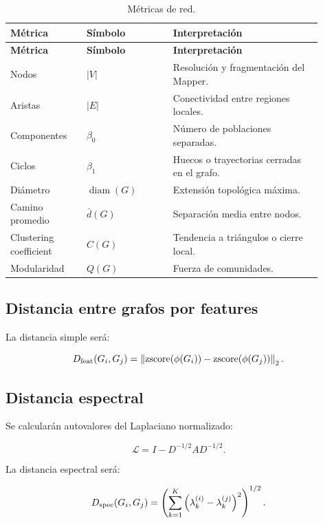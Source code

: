 \documentclass[11pt,letterpaper]{article}
\begin{document}
\begin{longtable}{p{0.22\linewidth}p{0.25\linewidth}p{0.43\linewidth}}
\caption{Métricas de red.}\\
\toprule
\textbf{Métrica} & \textbf{Símbolo} & \textbf{Interpretación} \\
\midrule
\endfirsthead
\toprule
\textbf{Métrica} & \textbf{Símbolo} & \textbf{Interpretación} \\
\midrule
\endhead
Nodos & $|V|$ & Resolución y fragmentación del Mapper. \\
Aristas & $|E|$ & Conectividad entre regiones locales. \\
Componentes & $\beta_0$ & Número de poblaciones separadas. \\
Ciclos & $\beta_1$ & Huecos o trayectorias cerradas en el grafo. \\
Diámetro & $\operatorname{diam}(G)$ & Extensión topológica máxima. \\
Camino promedio & $\bar d(G)$ & Separación media entre nodos. \\
Clustering coefficient & $C(G)$ & Tendencia a triángulos o cierre local. \\
Modularidad & $Q(G)$ & Fuerza de comunidades. \\
\bottomrule
\end{longtable}

\subsection{Distancia entre grafos por features}

La distancia simple será:

\begin{equation}
D_{\rm feat}(G_i,G_j)=\left\|\operatorname{zscore}(\phi(G_i))-\operatorname{zscore}(\phi(G_j))\right\|_2.
\end{equation}

\subsection{Distancia espectral}

Se calcularán autovalores del Laplaciano normalizado:

\begin{equation}
\mathcal{L}=I-D^{-1/2}AD^{-1/2}.
\end{equation}

La distancia espectral será:

\begin{equation}
D_{\rm spec}(G_i,G_j)=\left(\sum_{k=1}^{K}\left(\lambda_k^{(i)}-\lambda_k^{(j)}\right)^2\right)^{1/2}.
\end{equation}
\end{document}
